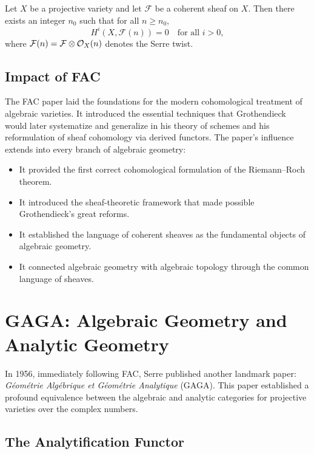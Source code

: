 \begin{theorem}
Let \(X\) be a projective variety and let \(\mathcal{F}\) be a coherent sheaf on \(X\). Then there exists an integer \(n_0\) such that for all \(n \geq n_0\),
\[
H^i(X, \mathcal{F}(n)) = 0 \quad \text{for all } i > 0,
\]
where \(\mathcal{F}(n) = \mathcal{F} \otimes \mathcal{O}_X(n)\) denotes the Serre twist.
\end{theorem}

\subsection{Impact of FAC}

The FAC paper laid the foundations for the modern cohomological treatment of algebraic varieties. It introduced the essential techniques that Grothendieck would later systematize and generalize in his theory of schemes and his reformulation of sheaf cohomology via derived functors. The paper's influence extends into every branch of algebraic geometry:

\begin{itemize}
    \item It provided the first correct cohomological formulation of the Riemann--Roch theorem.
    \item It introduced the sheaf-theoretic framework that made possible Grothendieck's great reforms.
    \item It established the language of coherent sheaves as the fundamental objects of algebraic geometry.
    \item It connected algebraic geometry with algebraic topology through the common language of sheaves.
\end{itemize}

\section{GAGA: Algebraic Geometry and Analytic Geometry}

In 1956, immediately following FAC, Serre published another landmark paper: \textit{G\'eom\'etrie Alg\'ebrique et G\'eom\'etrie Analytique} (GAGA). This paper established a profound equivalence between the algebraic and analytic categories for projective varieties over the complex numbers.

\subsection{The Analytification Functor}

